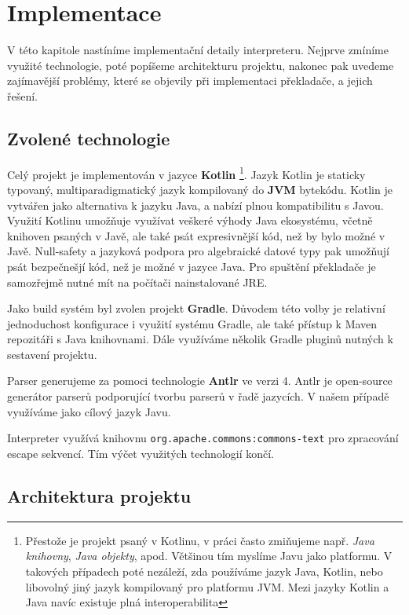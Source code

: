 \chapter{Implementace}

V této kapitole nastíníme implementační detaily interpreteru. Nejprve zmíníme využité technologie,
poté popíšeme architekturu projektu, nakonec pak uvedeme zajímavější problémy, které se objevily
při implementaci překladače, a jejich řešení.

\section{Zvolené technologie}

Celý projekt je implementován v jazyce \textbf{Kotlin} \footnote{Přestože je projekt psaný
  v Kotlinu, v práci často zmiňujeme např. \textit{Java knihovny}, \textit{Java objekty}, apod.
  Většinou tím myslíme Javu jako platformu. V takových případech poté nezáleží, zda
  používáme jazyk Java, Kotlin, nebo libovolný jiný jazyk kompilovaný pro platformu JVM.
  Mezi jazyky Kotlin a Java navíc existuje plná interoperabilita}.
Jazyk Kotlin je staticky typovaný, multiparadigmatický jazyk kompilovaný do \textbf{JVM} bytekódu.
Kotlin je vytvářen jako alternativa k jazyku Java, a nabízí plnou kompatibilitu s Javou. Využití
Kotlinu umožňuje využívat veškeré výhody Java ekosystému, včetně knihoven psaných v Javě, ale také
psát expresivnější kód, než by bylo možné v Javě. Null-safety a jazyková podpora pro algebraické
datové typy pak umožňují psát bezpečnešjí kód, než je možné v jazyce Java. Pro spuštění překladače
je samozřejmě nutné mít na počítači nainstalované JRE.

Jako build systém byl zvolen projekt \textbf{Gradle}. Důvodem této volby je relativní jednoduchost
konfigurace i využití systému Gradle, ale také přístup k Maven repozitáři s Java knihovnami. Dále
využíváme několik Gradle pluginů nutných k sestavení projektu.

Parser generujeme za pomoci technologie \textbf{Antlr} ve verzi 4. Antlr je open-source generátor
parserů podporující tvorbu parserů v řadě jazycích. V našem případě využíváme jako cílový jazyk
Javu.

Interpreter využívá knihovnu \lstinline{org.apache.commons:commons-text} pro zpracování escape
sekvencí. Tím výčet využitých technologií končí.

\section{Architektura projektu}

